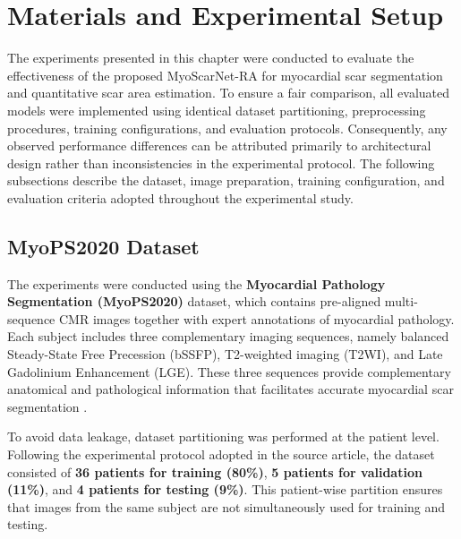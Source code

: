 \section{Materials and Experimental Setup}
\label{sec:ch6-materials}

The experiments presented in this chapter were conducted to evaluate the effectiveness of the proposed MyoScarNet-RA for myocardial scar segmentation and quantitative scar area estimation. To ensure a fair comparison, all evaluated models were implemented using identical dataset partitioning, preprocessing procedures, training configurations, and evaluation protocols. Consequently, any observed performance differences can be attributed primarily to architectural design rather than inconsistencies in the experimental protocol. The following subsections describe the dataset, image preparation, training configuration, and evaluation criteria adopted throughout the experimental study.

\subsection{MyoPS2020 Dataset}
\label{subsec:ch6-dataset}

The experiments were conducted using the \textbf{Myocardial Pathology Segmentation (MyoPS2020)} dataset, which contains pre-aligned multi-sequence CMR images together with expert annotations of myocardial pathology. Each subject includes three complementary imaging sequences, namely balanced Steady-State Free Precession (bSSFP), T2-weighted imaging (T2WI), and Late Gadolinium Enhancement (LGE). These three sequences provide complementary anatomical and pathological information that facilitates accurate myocardial scar segmentation \citep{Xue2020,Riandini2026Access}.

To avoid data leakage, dataset partitioning was performed at the patient level. Following the experimental protocol adopted in the source article, the dataset consisted of \textbf{36 patients for training (80\%)}, \textbf{5 patients for validation (11\%)}, and \textbf{4 patients for testing (9\%)}. This patient-wise partition ensures that images from the same subject are not simultaneously used for training and testing.




